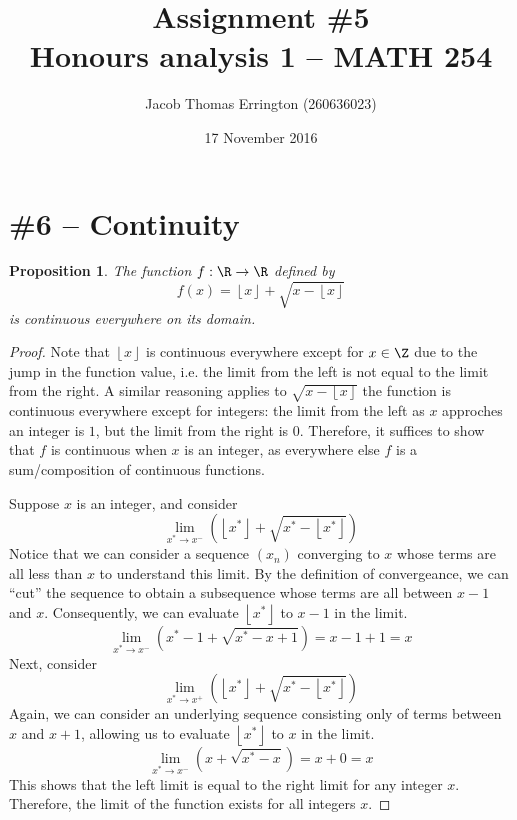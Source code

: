 \documentclass[letterpaper,11pt]{article}
\author{Jacob Thomas Errington (260636023)}
\title{Assignment \#5\\Honours analysis 1 -- MATH 254}
\date{17 November 2016}
\newcommand{\floor}[1]{\left\lfloor#1\right\rfloor}
\newcommand{\parens}[1]{\left(#1\right)}
\newtheorem{prop}{Proposition}
\begin{document}
\maketitle

\section*{\#6 -- Continuity}

\begin{prop}
    The function $f : \R \to \R$ defined by
    \begin{equation*}
        f(x) = \floor{x} + \sqrt{x - \floor{x}}
    \end{equation*}
    is continuous everywhere on its domain.
\end{prop}

\begin{proof}
    Note that $\floor{x}$ is continuous everywhere except for $x \in \Z$ due to
    the jump in the function value, i.e. the limit from the left is not equal
    to the limit from the right.
    A similar reasoning applies to $\sqrt{x - \floor{x}}$ the function is
    continuous everywhere except for integers: the limit from the left as $x$
    approches an integer is $1$, but the limit from the right is $0$.
    Therefore, it suffices to show that $f$ is continuous when $x$ is an
    integer, as everywhere else $f$ is a sum/composition of continuous
    functions.

    Suppose $x$ is an integer, and consider
    \begin{equation*}
        \lim_{x^* \to x^-}\parens{\floor{x^*} + \sqrt{x^* - \floor{x^*}}}
    \end{equation*}
    Notice that we can consider a sequence $(x_n)$ converging to $x$ whose
    terms are all less than $x$ to understand this limit. By the definition of
    convergeance, we can ``cut'' the sequence to obtain a subsequence whose
    terms are all between $x - 1$ and $x$.
    Consequently, we can evaluate $\floor{x^*}$ to $x - 1$ in the limit.
    \begin{equation*}
        \lim_{x^* \to x^-}\parens{x^* - 1 + \sqrt{x^* - x + 1}}
        = x - 1 + 1
        = x
    \end{equation*}
    Next, consider
    \begin{equation*}
        \lim_{x^* \to x^+}\parens{\floor{x^*} + \sqrt{x^* - \floor{x^*}}}
    \end{equation*}
    Again, we can consider an underlying sequence consisting only of terms
    between $x$ and $x + 1$, allowing us to evaluate $\floor{x^*}$ to $x$ in
    the limit.
    \begin{equation*}
        \lim_{x^* \to x^-}\parens{x + \sqrt{x^* - x}}
        = x + 0
        = x
    \end{equation*}
    This shows that the left limit is equal to the right limit for any integer
    $x$. Therefore, the limit of the function exists for all integers $x$.


\end{proof}
\end{document}
